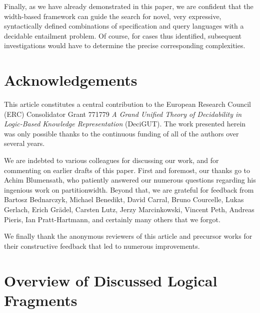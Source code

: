 \documentclass[10pt,a4paper]{amsart}
\theoremstyle{definition}
\numberwithin{equation}{section}
\theoremstyle{plain}
\theoremstyle{definition}
\theoremstyle{myexample}
\theoremstyle{plain}
\theoremstyle{definition}
\newcommand{\cut}{\triangleright}
\newcommand{\fus}{\mathbf{fus}}
\newcommand{\fps}{\mathbf{fps}} %
\newcommand{\hcs}{\fps}
\begin{document}
Finally, as we have already demonstrated in this paper, we are confident that the width-based framework can guide the search for novel, very expressive, syntactically defined combinations of specification and query languages with a decidable entailment problem. Of course, for cases thus identified, subsequent investigations would have to determine the precise corresponding complexities.  




\section*{Acknowledgements}

This article constitutes a central contribution to the European Research Council (ERC) Consolidator Grant 771779 \emph{A Grand Unified Theory of Decidability in Logic-Based Knowledge Representation} (DeciGUT).
The work presented herein was only possible thanks to the continuous funding of all of the authors over several years.

We are indebted to various colleagues for discussing our work, and for commenting on earlier drafts of this paper. First and foremost, our thanks go to Achim Blumensath, who patiently answered our numerous questions regarding his ingenious work on partitionwidth.
Beyond that, we are grateful for feedback from Bartosz Bednarczyk, Michael Benedikt, David Carral, Bruno Courcelle, Lukas Gerlach, Erich Grädel, Carsten Lutz, Jerzy Marcinkowski, Vincent Peth, Andreas Pieris, Ian Pratt-Hartmann, and certainly many others that we forgot. 

We finally thank the anonymous reviewers of this article and precursor works for their constructive feedback that led to numerous improvements.


\clearpage




\clearpage

\appendix

\section{Overview of Discussed Logical Fragments}\label{app:logicoverview}
\end{document}
